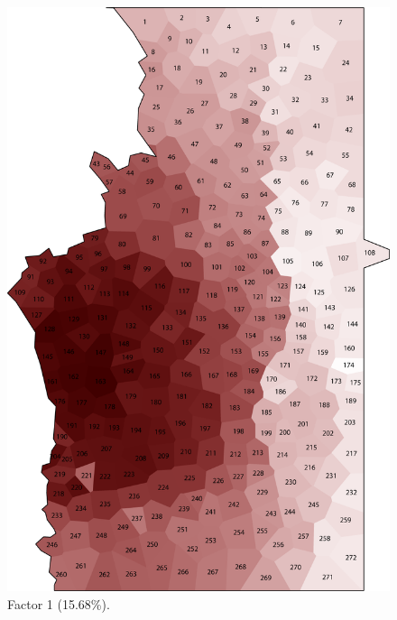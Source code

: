 \documentclass[output=paper]{LSP/langsci}
\begin{document}
\begin{figure}[t]
\includegraphics[height=0.5\textheight]{illustrations/pickl_fig2}
\caption{Factor 1 (15.68\%).}
\label{fig:pickl:2}
\end{figure}
\end{document}
